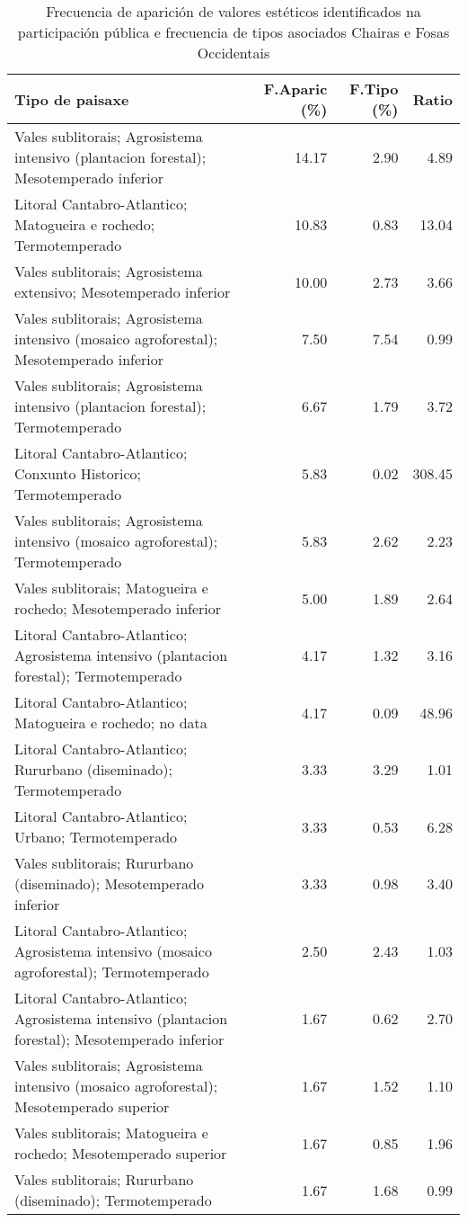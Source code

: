 \begin{table}[p]
\centering
\caption{Frecuencia de aparición de valores estéticos identificados na participación pública e frecuencia de tipos asociados Chairas e Fosas Occidentais} 
\label{vsixotest11}
\begin{tabular}{lrrr}
  \hline
Tipo de paisaxe & F.Aparic (\%) & F.Tipo (\%) & Ratio \\ 
  \hline
Vales sublitorais; Agrosistema intensivo (plantacion forestal); Mesotemperado inferior & 14.17 & 2.90 & 4.89 \\ 
  Litoral Cantabro-Atlantico; Matogueira e rochedo; Termotemperado & 10.83 & 0.83 & 13.04 \\ 
  Vales sublitorais; Agrosistema extensivo; Mesotemperado inferior & 10.00 & 2.73 & 3.66 \\ 
  Vales sublitorais; Agrosistema intensivo (mosaico agroforestal); Mesotemperado inferior & 7.50 & 7.54 & 0.99 \\ 
  Vales sublitorais; Agrosistema intensivo (plantacion forestal); Termotemperado & 6.67 & 1.79 & 3.72 \\ 
  Litoral Cantabro-Atlantico; Conxunto Historico; Termotemperado & 5.83 & 0.02 & 308.45 \\ 
  Vales sublitorais; Agrosistema intensivo (mosaico agroforestal); Termotemperado & 5.83 & 2.62 & 2.23 \\ 
  Vales sublitorais; Matogueira e rochedo; Mesotemperado inferior & 5.00 & 1.89 & 2.64 \\ 
  Litoral Cantabro-Atlantico; Agrosistema intensivo (plantacion forestal); Termotemperado & 4.17 & 1.32 & 3.16 \\ 
  Litoral Cantabro-Atlantico; Matogueira e rochedo; no data & 4.17 & 0.09 & 48.96 \\ 
  Litoral Cantabro-Atlantico; Rururbano (diseminado); Termotemperado & 3.33 & 3.29 & 1.01 \\ 
  Litoral Cantabro-Atlantico; Urbano; Termotemperado & 3.33 & 0.53 & 6.28 \\ 
  Vales sublitorais; Rururbano (diseminado); Mesotemperado inferior & 3.33 & 0.98 & 3.40 \\ 
  Litoral Cantabro-Atlantico; Agrosistema intensivo (mosaico agroforestal); Termotemperado & 2.50 & 2.43 & 1.03 \\ 
  Litoral Cantabro-Atlantico; Agrosistema intensivo (plantacion forestal); Mesotemperado inferior & 1.67 & 0.62 & 2.70 \\ 
  Vales sublitorais; Agrosistema intensivo (mosaico agroforestal); Mesotemperado superior & 1.67 & 1.52 & 1.10 \\ 
  Vales sublitorais; Matogueira e rochedo; Mesotemperado superior & 1.67 & 0.85 & 1.96 \\ 
  Vales sublitorais; Rururbano (diseminado); Termotemperado & 1.67 & 1.68 & 0.99 \\ 
   \hline
\end{tabular}
\end{table}
